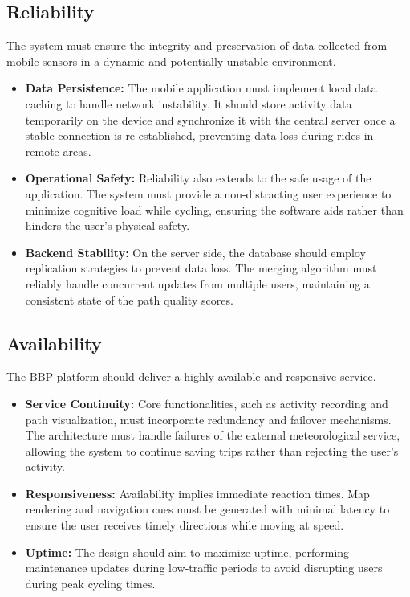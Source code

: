 \subsection{Reliability}
\label{subsec:reliability}
The system must ensure the integrity and preservation of data collected from mobile sensors in a dynamic and potentially unstable environment.

\begin{itemize}
    \item \textbf{Data Persistence:} The mobile application must implement local data caching to handle network instability. It should store activity data temporarily on the device and synchronize it with the central server once a stable connection is re-established, preventing data loss during rides in remote areas.
    
    \item \textbf{Operational Safety:} Reliability also extends to the safe usage of the application. The system must provide a non-distracting user experience to minimize cognitive load while cycling, ensuring the software aids rather than hinders the user's physical safety.
    
    \item \textbf{Backend Stability:} On the server side, the database should employ replication strategies to prevent data loss. The merging algorithm must reliably handle concurrent updates from multiple users, maintaining a consistent state of the path quality scores.
\end{itemize}

\subsection{Availability}
\label{subsec:availability}
The BBP platform should deliver a highly available and responsive service.

\begin{itemize}
    \item \textbf{Service Continuity:} Core functionalities, such as activity recording and path visualization, must incorporate redundancy and failover mechanisms. The architecture must handle failures of the external meteorological service, allowing the system to continue saving trips rather than rejecting the user's activity.
    
    \item \textbf{Responsiveness:} Availability implies immediate reaction times. Map rendering and navigation cues must be generated with minimal latency to ensure the user receives timely directions while moving at speed.
    
    \item \textbf{Uptime:} The design should aim to maximize uptime, performing maintenance updates during low-traffic periods to avoid disrupting users during peak cycling times.
\end{itemize}

